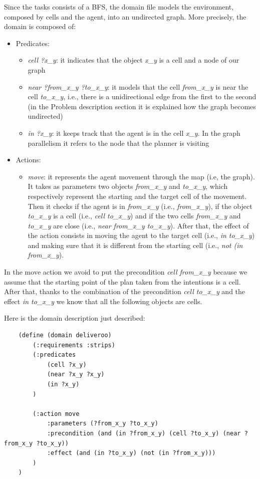 \documentclass[a4paper, 11pt]{article}
\begin{document}
Since the tasks consists of a BFS, the domain file models the environment, composed by cells and the agent, into an undirected graph.
More precisely, the domain is composed of:
\begin{itemize}
    \item Predicates:
    \begin{itemize}
        \item \emph{cell ?x\_y}: it indicates that the object \emph{x\_y} is a cell and a node of our graph
        \item \emph{near ?from\_x\_y ?to\_x\_y}: it models that the cell \emph{from\_x\_y} is near the cell \emph{to\_x\_y}, i.e., there is a unidirectional edge from the first to the second (in the Problem description section it is explained how the graph becomes undirected)
        \item \emph{in ?x\_y}: it keeps track that the agent is in the cell \emph{x\_y}. In the graph parallelism it refers to the node that the planner is visiting
    \end{itemize}
    \item Actions:
    \begin{itemize}
        \item \emph{move}: it represents the agent movement through the map (i.e, the graph). It takes as parameters two objects \emph{from\_x\_y} and \emph{to\_x\_y}, which respectively represent the starting and the target cell of the movement. Then it checks if the agent is in \emph{from\_x\_y} (i.e., \emph{from\_x\_y}), if the object \emph{to\_x\_y} is a cell (i.e., \emph{cell to\_x\_y}) and if the two cells \emph{from\_x\_y} and \emph{to\_x\_y} are close (i.e., \emph{near from\_x\_y to\_x\_y}).
        After that, the effect of the action consists in moving the agent to the target cell (i.e., \emph{in to\_x\_y}) and making sure that it is different from the starting cell (i.e., \emph{not (in from\_x\_y}).
    \end{itemize}
\end{itemize}

In the move action we avoid to put the precondition \emph{cell from\_x\_y} because we assume that the starting point of the plan taken from the intentions is a cell. After that, thanks to the combination of the precondition \emph{cell to\_x\_y} and the effect \emph{in to\_x\_y} we know that all the following objects are cells.

Here is the domain description just described:
\begin{verbatim}
    (define (domain deliveroo)
        (:requirements :strips)
        (:predicates
            (cell ?x_y)
            (near ?x_y ?x_y)
            (in ?x_y)
        )
        
        (:action move
            :parameters (?from_x_y ?to_x_y)
            :precondition (and (in ?from_x_y) (cell ?to_x_y) (near ?from_x_y ?to_x_y))
            :effect (and (in ?to_x_y) (not (in ?from_x_y)))
        )
    )
\end{verbatim}
\end{document}
